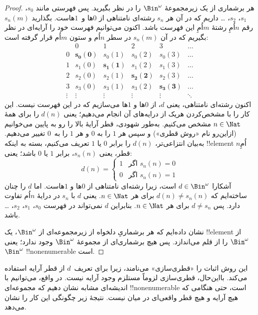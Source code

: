 \documentclass[../../../include/open-logic-section]{subfiles}
\begin{document}
\begin{proof}
هر برشماری از یک زیرمجموعهٔ $\Bin^\omega$ را در نظر بگیرید. پس فهرستی
مانند $s_{0}$، $s_{1}$، $s_{2}$، \dots{} داریم که در آن هر $s_n$ رشته‌ای
نامتناهی از $0$ها و~$1$هاست. بگذارید $s_n(m)$ رقم $n$اُمِ رشتهٔ $m$اُمِ
این فهرست باشد. اکنون می‌توانیم فهرست خود را آرایه‌ای در نظر بگیریم که
در آن $s_n(m)$ در سطر $n$اُم و ستون $m$اُم قرار گرفته است:
\[
\begin{array}{c|c|c|c|c|c}
& 0 & 1 & 2 & 3 & \dots \\\hline
0 & \mathbf{s_{0}(0)} & s_{0}(1) & s_{0}(2) & s_0(3) & \dots \\\hline
1 & s_{1}(0)& \mathbf{s_{1}(1)} & s_1(2) & s_1(3) & \dots \\\hline
2 & s_{2}(0)& s_{2}(1) & \mathbf{s_2(2)} & s_2(3) & \dots \\\hline
3 & s_{3}(0)& s_{3}(1) & s_3(2) & \mathbf{s_3(3)} & \dots \\\hline
\vdots & \vdots & \vdots & \vdots & \vdots & \mathbf{\ddots}
\end{array}
\]
اکنون رشته‌ای نامتناهی، یعنی $d$، از $0$ها و $1$ها می‌سازیم که در این
فهرست نیست. این کار را با مشخص‌کردن هریک از درایه‌های آن انجام می‌دهیم؛
یعنی $d(n)$ را برای همهٔ $n \in \Nat$ مشخص می‌کنیم. به‌طور شهودی، قطر
آرایهٔ بالا را رو به پایین می‌خوانیم (ازاین‌رو نام «روش قطری») و سپس هر
$1$ را به $0$ و هر $1$ را به~$0$ تغییر می‌دهیم. به‌بیان انتزاعی‌تر،
$d(n)$ را برابر $0$ یا $1$ تعریف می‌کنیم، بسته به اینکه !!{element}
$n$اُمِ قطر، یعنی $s_n(n)$، برابر $1$ یا $0$ باشد؛ یعنی:
\[
d(n) =
\begin{cases}
1 & \text{اگر $s_{n}(n) = 0$}\\
0 & \text{اگر $s_{n}(n) = 1$}
\end{cases}
\]
آشکارا $d \in \Bin^\omega$ است، زیرا رشته‌ای نامتناهی از $0$ها و $1$هاست.
اما $d$ را چنان ساخته‌ایم که $d(n) \neq s_n(n)$ برای هر $n \in \Nat$.
یعنی $d$ با $s_n$ در درایهٔ $n$اُم تفاوت دارد. پس $d \neq s_n$
برای هر $n\in \Nat$. بنابراین $d$ نمی‌تواند در فهرست
$s_0$، $s_1$، $s_2$،
\dots باشد.

نشان داده‌ایم که هر برشماریِ دلخواه از زیرمجموعه‌ای از $\Bin^\omega$،
یک !!{element} از $\Bin^\omega$ را از قلم می‌اندازد. پس هیچ برشماری‌ای
از مجموعهٔ $\Bin^\omega$ وجود ندارد؛ یعنی $\Bin^\omega$
!!{nonenumerable} است.
\end{proof}

\begin{explain}
این روش اثبات را «قطری‌سازی» می‌نامند، زیرا برای تعریف~$d$ از قطر آرایه
استفاده می‌کند. بااین‌حال، قطری‌سازی لزوماً مستلزم وجود آرایه نیست. در
واقع، می‌توانیم با اندیشه‌ای مشابه نشان دهیم که مجموعه‌ای
!!{nonenumerable} است، حتی هنگامی که هیچ آرایه و هیچ قطر واقعی‌ای در
میان نیست. نتیجهٔ زیر چگونگی این کار را نشان می‌دهد.
\end{explain}
\end{document}
